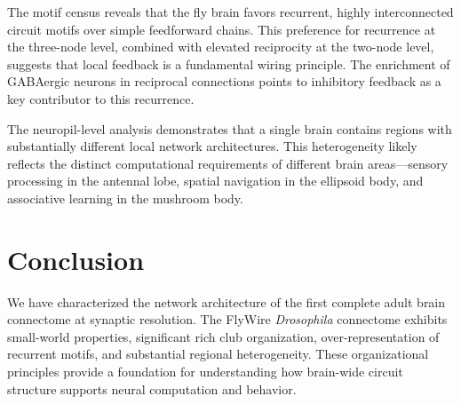\documentclass[11pt]{article}
\begin{document}
The motif census reveals that the fly brain favors recurrent, highly interconnected circuit motifs over simple feedforward chains. This preference for recurrence at the three-node level, combined with elevated reciprocity at the two-node level, suggests that local feedback is a fundamental wiring principle. The enrichment of GABAergic neurons in reciprocal connections points to inhibitory feedback as a key contributor to this recurrence.

The neuropil-level analysis demonstrates that a single brain contains regions with substantially different local network architectures. This heterogeneity likely reflects the distinct computational requirements of different brain areas---sensory processing in the antennal lobe, spatial navigation in the ellipsoid body, and associative learning in the mushroom body.

\section{Conclusion}

We have characterized the network architecture of the first complete adult brain connectome at synaptic resolution. The FlyWire \textit{Drosophila} connectome exhibits small-world properties, significant rich club organization, over-representation of recurrent motifs, and substantial regional heterogeneity. These organizational principles provide a foundation for understanding how brain-wide circuit structure supports neural computation and behavior.



\end{document}
